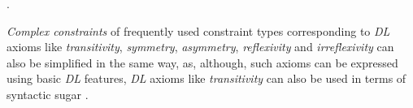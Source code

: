 \documentclass[a4paper,fontsize=11pt]{scrartcl}
\newcommand{\ms}[1]{\texttt{#1}}
\newenvironment{DL}{
  \vspace{0cm}
	\begin{center}
  \begin{tabular}{r l}

}{
  \end{tabular}
	\end{center}
}
\begin{document}
\begin{ex} .
\end{ex}

\emph{Complex constraints} of frequently used constraint types corresponding to \emph{DL} axioms like 
\emph{transitivity}, \emph{symmetry}, \emph{asymmetry}, \emph{reflexivity} and \emph{irreflexivity}
can also be simplified in the same way, 
as, although, such axioms can be expressed using basic \emph{DL} features, 
\emph{DL} axioms like \emph{transitivity} can also be used in terms of syntactic sugar \cite{BoschEckert2015-2}.
%
%
%
%
%
\end{document}
